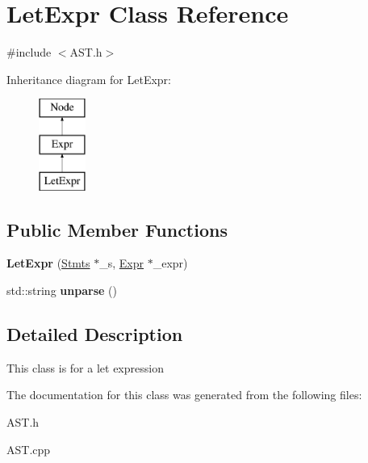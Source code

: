 \hypertarget{classLetExpr}{\section{Let\-Expr Class Reference}
\label{classLetExpr}
}


{\ttfamily \#include $<$A\-S\-T.\-h$>$}

Inheritance diagram for Let\-Expr\-:\begin{figure}[H]
\begin{center}
\leavevmode
\includegraphics[height=3.000000cm]{classLetExpr}
\end{center}
\end{figure}
\subsection*{Public Member Functions}
\begin{DoxyCompactItemize}
\item 
\hypertarget{classLetExpr_a738f5ec4b4bca67ed0a285891c184f6f}{{\bfseries Let\-Expr} (\hyperlink{classStmts}{Stmts} $\ast$\-\_\-s, \hyperlink{classExpr}{Expr} $\ast$\-\_\-expr)}\label{classLetExpr_a738f5ec4b4bca67ed0a285891c184f6f}

\item 
\hypertarget{classLetExpr_a47e9e62ebec3114d50c127223fff126b}{std\-::string {\bfseries unparse} ()}\label{classLetExpr_a47e9e62ebec3114d50c127223fff126b}

\end{DoxyCompactItemize}


\subsection{Detailed Description}
This class is for a let expression 

The documentation for this class was generated from the following files\-:\begin{DoxyCompactItemize}
\item 
A\-S\-T.\-h\item 
A\-S\-T.\-cpp\end{DoxyCompactItemize}

